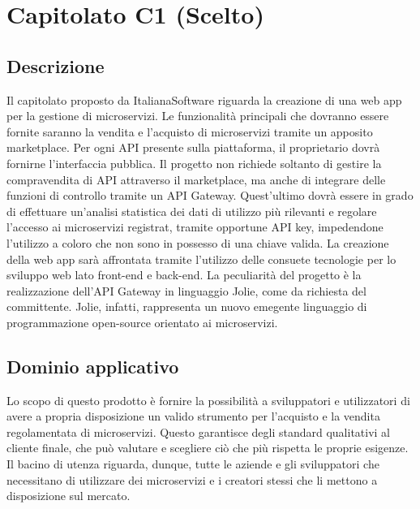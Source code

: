 \newpage
\section{Capitolato C1 (Scelto)}

\subsection{Descrizione}

Il capitolato proposto da ItalianaSoftware riguarda la creazione di una web app per la gestione di microservizi. Le funzionalità principali che dovranno essere fornite saranno la vendita e l'acquisto di microservizi tramite un apposito marketplace. Per ogni API presente sulla piattaforma, il proprietario dovrà fornirne l'interfaccia pubblica. Il progetto non richiede soltanto di gestire la compravendita di API attraverso il marketplace, ma anche di integrare delle funzioni di controllo tramite un API Gateway. Quest'ultimo dovrà essere in grado di effettuare un'analisi statistica dei dati di utilizzo più rilevanti e regolare l'accesso ai microservizi registrat, tramite opportune API key, impedendone l'utilizzo a coloro che non sono in possesso di una chiave valida. La creazione della web
app sarà affrontata tramite l'utilizzo delle consuete tecnologie per lo sviluppo web lato front-end e back-end. La peculiarità del progetto è la realizzazione dell'API Gateway in linguaggio Jolie, come da richiesta del committente. Jolie, infatti, rappresenta un nuovo emegente linguaggio di programmazione open-source orientato ai microservizi.

\subsection{Dominio applicativo}

Lo scopo di questo prodotto è fornire la possibilità a sviluppatori e utilizzatori di avere a propria disposizione un valido strumento per l'acquisto e la vendita regolamentata di microservizi. Questo garantisce degli standard qualitativi al cliente finale, che può valutare e scegliere ciò che più rispetta le proprie esigenze. Il bacino di utenza riguarda, dunque, tutte le aziende e gli sviluppatori che necessitano di utilizzare dei microservizi e i creatori stessi che li mettono a disposizione sul mercato.

